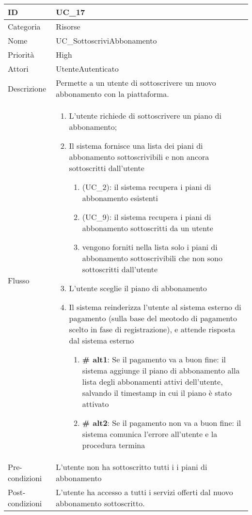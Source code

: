 \begin{center}
\begin{tabular}{ |p{2cm}|p{13cm}|  }
\hline
ID & UC\_17 \\\hline
Categoria & Risorse\\\hline
Nome & UC\_SottoscriviAbbonamento\\\hline
Priorità & High \\\hline
Attori &  UtenteAutenticato \\\hline
Descrizione & Permette a un utente di sottoscrivere un nuovo abbonamento con la piattaforma.\\\hline
Flusso &  	\begin{enumerate}
			\item L'utente richiede di sottoscrivere un piano di abbonamento;
			\item Il sistema fornisce una lista dei piani di abbonamento sottoscrivibili e non ancora sottoscritti dall'utente
				\begin{enumerate}[  ]
				\item (UC\_2): il sistema recupera i piani di abbonamento esistenti
				\item (UC\_9): il sistema recupera i piani di abbonamento sottoscritti da un utente
				\item vengono forniti nella lista solo i piani di abbonamento sottoscrivibili che non sono sottoscritti dall'utente
				\end{enumerate}
			\item L'utente sceglie il piano di abbonamento
			\item Il sistema reinderizza l'utente al sistema esterno di pagamento (sulla base del meotodo di pagamento scelto in fase di registrazione), e attende risposta dal sistema esterno
			\begin{enumerate}[  ]
				\item \textbf{\# alt1}: Se il pagamento va a buon fine: il sistema aggiunge il piano di abbonamento alla lista degli abbonamenti attivi dell'utente, salvando il timestamp in cui il piano è stato attivato
				\item \textbf{\# alt2}: Se il pagamento non va a buon fine: il sistema comunica l'errore all'utente e la procedura termina
			\end{enumerate}
		\end{enumerate}\\\hline
Pre-condizioni & L'utente non ha sottoscritto tutti i i piani di abbonamento\\\hline
Post-condizioni &  L'utente ha accesso a tutti i servizi offerti dal nuovo abbonamento sottoscritto.\\\hline
\end{tabular}
\label{table_use_case:17}\newline


\end{center}
